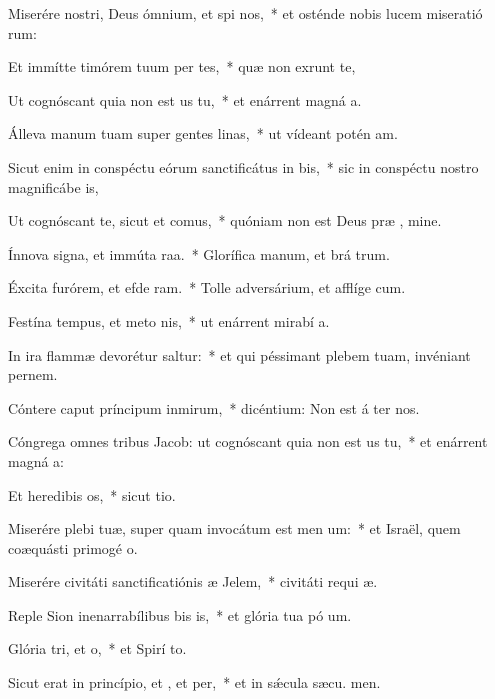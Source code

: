 \item Miserére nostri, Deus ómnium, et spi nos,~* et osténde nobis lucem miseratió rum:
\item Et immítte timórem tuum per tes,~* quæ non exrunt te,
\item Ut cognóscant quia non est us  tu,~* et enárrent magná a.
\item Álleva manum tuam super gentes linas,~* ut vídeant potén am.
\item Sicut enim in conspéctu eórum sanctificátus  in bis,~* sic in conspéctu nostro magnificábe  is,
\item Ut cognóscant te, sicut et  comus,~* quóniam non est Deus præ , mine.
\item Ínnova signa, et immúta raa.~* Glorífica manum, et brá trum.
\item Éxcita furórem, et efde ram.~* Tolle adversárium, et afflíge cum.
\item Festína tempus, et meto nis,~* ut enárrent mirabí a.
\item In ira flammæ devorétur  saltur:~* et qui péssimant plebem tuam, invéniant pernem.
\item Cóntere caput príncipum inmirum,~* dicéntium: Non est á ter nos.
\item Cóngrega omnes tribus Jacob: ut cognóscant quia non est us  tu,~* et enárrent magná a:
\item Et heredibis os,~* sicut  tio.
\item Miserére plebi tuæ, super quam invocátum est men um:~* et Israël, quem coæquásti primogé o.
\item Miserére civitáti sanctificatiónis æ Jelem,~* civitáti requi æ.
\item Reple Sion inenarrabílibus bis is,~* et glória tua pó um.
\item Glória tri, et o,~* et Spirí to.
\item Sicut erat in princípio, et , et per,~* et in sǽcula sæcu. men.
